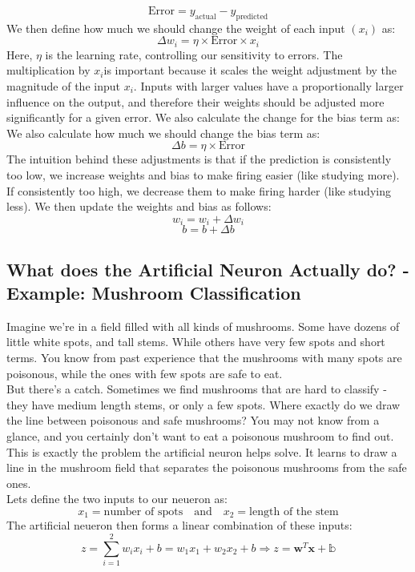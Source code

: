 \documentclass[9pt]{extarticle}
\theoremstyle{plain}
\theoremstyle{definition}
\theoremstyle{remark}
\begin{document}
$$\text{Error} = y_{\text{actual}} - y_{\text{predicted}}$$
We then define how much we should change the weight of each input $(x_i)$ as:
$$\Delta w_i = \eta \times \text{Error} \times x_i$$
Here, $\eta$ is the learning rate, controlling our sensitivity to errors.
The multiplication by $x_i$is important because it scales the weight adjustment by the magnitude of the input $x_i$.
Inputs with larger values have a proportionally larger influence on the output,
and therefore their weights should be adjusted more significantly for a given error.
We also calculate the change for the bias term as:
We also calculate how much we should change the bias term as:
$$\Delta b = \eta \times \text{Error}$$
The intuition behind these adjustments is that if the prediction is consistently too low, we increase weights and bias to make firing easier (like studying more).
If consistently too high, we decrease them to make firing harder (like studying less). We then update the weights and bias as follows:
$$w_i = w_i + \Delta w_i$$
$$b = b + \Delta b$$


\pagebreak

\subsection{What does the Artificial Neuron Actually do? - Example: Mushroom Classification}
Imagine we're in a field filled with all kinds of mushrooms. Some have dozens of little white spots, and tall stems. While others have very few spots and short terms.
You know from past experience that the mushrooms with many spots are poisonous, while the ones with few spots are safe to eat. \\[2ex]
But there's a catch. Sometimes we find mushrooms that are hard to classify - they have medium length stems, or only a few spots. Where exactly do we draw the line between poisonous and safe mushrooms? You may not know from a glance, and you
certainly don't want to eat a poisonous mushroom to find out. \\[2ex]
This is exactly the problem the artificial neuron helps solve. It learns to draw a line in the mushroom field that separates the poisonous mushrooms from the safe ones.\\
Lets define the two inputs to our neueron as:
$$x_1 = \text{number of spots} \quad \text{and} \quad x_2 = \text{length of the stem}$$
The artificial neueron then forms a linear combination of these inputs:
$$z = \sum_{i=1}^{2} w_i x_i + b = w_1 x_1 + w_2 x_2 + b \Rightarrow z = \mathbf{w}^T \mathbf{x} + \mathbb{b}$$
\end{document}
